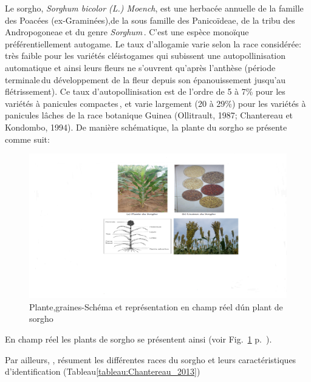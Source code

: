 \documentclass[a4paper,11pt]{article}
\begin{document}
Le sorgho, \emph{Sorghum bicolor (L.) Moench}, est une herbacée annuelle de
la famille des Poacées (ex-Graminées),de la sous famille des Panicoïdeae,
de la tribu des Andropogoneae et du genre \emph{Sorghum}\,\cite{Doggett_1988}.
C’est une espèce monoïque préférentiellement autogame. Le taux d’allogamie
varie selon la race considérée: très faible pour les variétés cléistogames qui subissent une
autopollinisation automatique et ainsi leurs fleurs ne s’ouvrent qu’après l’anthèse (période terminale\,du développement de la fleur depuis son épanouissement jusqu’au
flétrissement). Ce taux d'autopollinisation est de l’ordre de 5 à 7\% pour les variétés à
panicules compactes\,\cite{Doggett_1988}, et varie largement (20 à 29\%)
pour les variétés à panicules lâches de la race botanique Guinea
(Ollitrault, 1987; Chantereau et Kondombo, 1994). De manière
schématique, la plante du sorgho se présente comme suit:


 
\begin{figure}%
  \begin{center}
    \includegraphics[width=16cm]{images/SchemaComposePage5}
  \end{center}
  \caption{Plante,graines-Schéma et représentation en champ réel d\'un plant de sorgho}
   \label{fig-SchemaComposePage5}
\end{figure}

En champ réel les plants de sorgho se présentent ainsi (voir
Fig.~\ref{fig-SchemaComposePage5}
p.~\pageref{fig-SchemaComposePage5}).


Par ailleurs, , résument les différentes races du sorgho et
leurs caractéristiques d'identification (Tableau\ref{tableau:Chantereau_2013})
\end{document}
